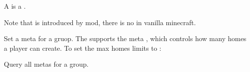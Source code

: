 \label{ch:meta}
A  is a .

\begin{note}{}
    Note that  is introduced by  mod, there is no  in vanilla minecraft.
\end{note}


\begin{example}{Set a meta for a gruop.}
    The  supports the meta , which controls how many homes a player can create.
    To set the max homes limits to : 
\end{example}

\begin{example}{Query all metas for a group.}
\end{example}